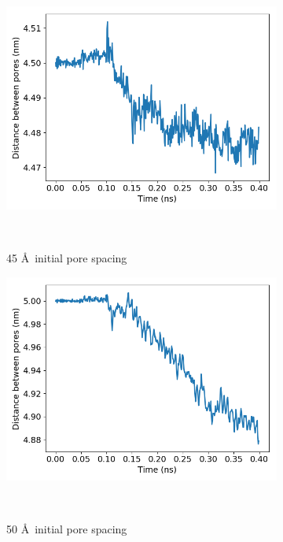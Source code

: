 \documentclass[journal=jpcbfk,manusciprt=article]{achemso}
\begin{document}
\begin{figure}[!htb]
		\begin{subfigure}{0.3\textwidth}
			\includegraphics[width=\textwidth]{p2p_45.png}
			\vspace{-1.25em}
			\caption{45 \AA~initial pore spacing}~\label{fig:p2p_45}
		\end{subfigure}
		\begin{subfigure}{0.3\textwidth}
			\includegraphics[width=\textwidth]{p2p_50.png}\quad	
			\vspace{-1.25em}
			\caption{50 \AA~initial pore spacing}~\label{fig:p2p_50}
		\end{subfigure}
		\begin{subfigure}{0.3\textwidth}

\end{subfigure}
\end{figure}
\end{document}
